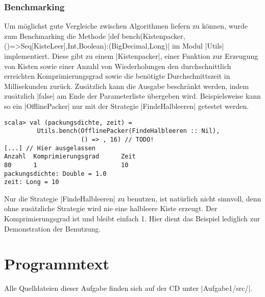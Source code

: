 \subsubsection{Benchmarking}
 Um möglichst gute Vergleiche zwischen Algorithmen liefern zu können,
  wurde zum Benchmarking die Methode |def bench(Kistenpacker,()=>Seq[KisteLeer],Int,Boolean):(BigDecimal,Long)| im Modul |Utils| implementiert.
 Diese gibt zu einem |Kistenpacker|,
  einer Funktion zur Erzeugung von Kisten sowie einer Anzahl von Wiederholungen den durchschnittlich erreichten Komprimierungsgrad sowie die benötigte Durchschnittszeit in Millisekunden zurück.
 Zusätzlich kann die Ausgabe beschränkt werden, indem zusätzlich |false| am Ende der Parameterliste übergeben wird.
 Beispielsweise kann so ein |OfflinePacker| nur mit der Strategie |FindeHalbleeren| getestet werden.
\begin{lstlisting}
scala> val (packungsdichte, zeit) =
         Utils.bench(OfflinePacker(FindeHalbleeren :: Nil),
                     () => , 16) // TODO!
[...] // Hier ausgelassen
Anzahl  Komprimierungsgrad      Zeit
80      1                       10
packungsdichte: Double = 1.0
zeit: Long = 10
\end{lstlisting}
 Nur die Strategie |FindeHalbleeren| zu benutzen, ist natürlich nicht sinnvoll,
  denn ohne zusätzliche Strategie wird nie eine halbleere Kiste erzeugt. Der Komprimierungsgrad ist und bleibt einfach 1.
 Hier dient das Beispiel lediglich zur Demonstration der Benutzung.

\addtolength{\textheight}{2.08cm}
\lstset{xleftmargin=-0cm,xrightmargin=-.8cm}
\fontsize{8pt}{8.4pt}
\lstset{basicstyle=\ttfamily\small}
\clearpage
\setlength{\voffset}{-.68cm}
\setlength{\hoffset}{-.8cm}
\section{Programmtext}
\label{code1}
Alle Quelldateien dieser Aufgabe finden sich auf der CD unter |Aufgabe1/src/|.
